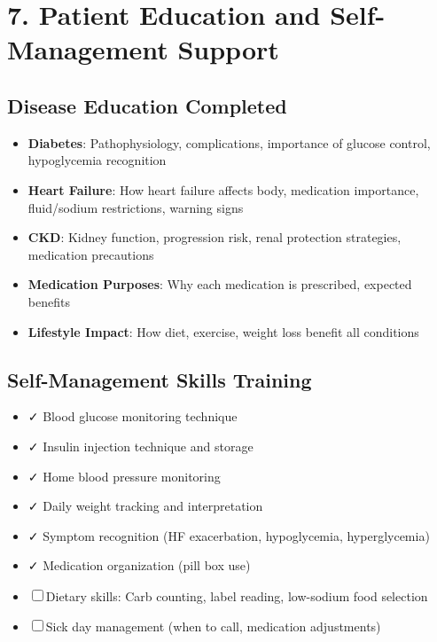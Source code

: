 \documentclass[11pt,letterpaper]{article}
\begin{document}
\section*{7. Patient Education and Self-Management Support}

\subsection*{Disease Education Completed}

\begin{itemize}[leftmargin=*]
    \item \textbf{Diabetes}: Pathophysiology, complications, importance of glucose control, hypoglycemia recognition
    \item \textbf{Heart Failure}: How heart failure affects body, medication importance, fluid/sodium restrictions, warning signs
    \item \textbf{CKD}: Kidney function, progression risk, renal protection strategies, medication precautions
    \item \textbf{Medication Purposes}: Why each medication is prescribed, expected benefits
    \item \textbf{Lifestyle Impact}: How diet, exercise, weight loss benefit all conditions
\end{itemize}

\subsection*{Self-Management Skills Training}

\begin{itemize}[leftmargin=*]
    \item ✓ Blood glucose monitoring technique
    \item ✓ Insulin injection technique and storage
    \item ✓ Home blood pressure monitoring
    \item ✓ Daily weight tracking and interpretation
    \item ✓ Symptom recognition (HF exacerbation, hypoglycemia, hyperglycemia)
    \item ✓ Medication organization (pill box use)
    \item ☐ Dietary skills: Carb counting, label reading, low-sodium food selection
    \item ☐ Sick day management (when to call, medication adjustments)
\end{itemize}
\end{document}
